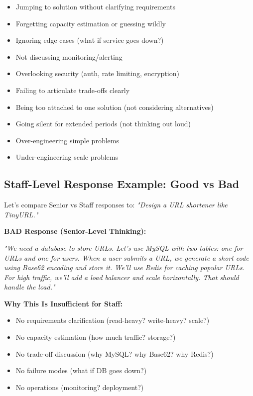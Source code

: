 \documentclass[10pt]{article}
\begin{document}
\begin{itemize}
\item Jumping to solution without clarifying requirements
\item Forgetting capacity estimation or guessing wildly
\item Ignoring edge cases (what if service goes down?)
\item Not discussing monitoring/alerting
\item Overlooking security (auth, rate limiting, encryption)
\item Failing to articulate trade-offs clearly
\item Being too attached to one solution (not considering alternatives)
\item Going silent for extended periods (not thinking out loud)
\item Over-engineering simple problems
\item Under-engineering scale problems
\end{itemize}

\subsection{Staff-Level Response Example: Good vs Bad}

Let's compare Senior vs Staff responses to: \textit{"Design a URL shortener like TinyURL."}

\textbf{BAD Response (Senior-Level Thinking):}

\textit{"We need a database to store URLs. Let's use MySQL with two tables: one for URLs and one for users. When a user submits a URL, we generate a short code using Base62 encoding and store it. We'll use Redis for caching popular URLs. For high traffic, we'll add a load balancer and scale horizontally. That should handle the load."}

\textbf{Why This Is Insufficient for Staff:}
\begin{itemize}
\item No requirements clarification (read-heavy? write-heavy? scale?)
\item No capacity estimation (how much traffic? storage?)
\item No trade-off discussion (why MySQL? why Base62? why Redis?)
\item No failure modes (what if DB goes down?)
\item No operations (monitoring? deployment?)
\end{itemize}
\end{document}
